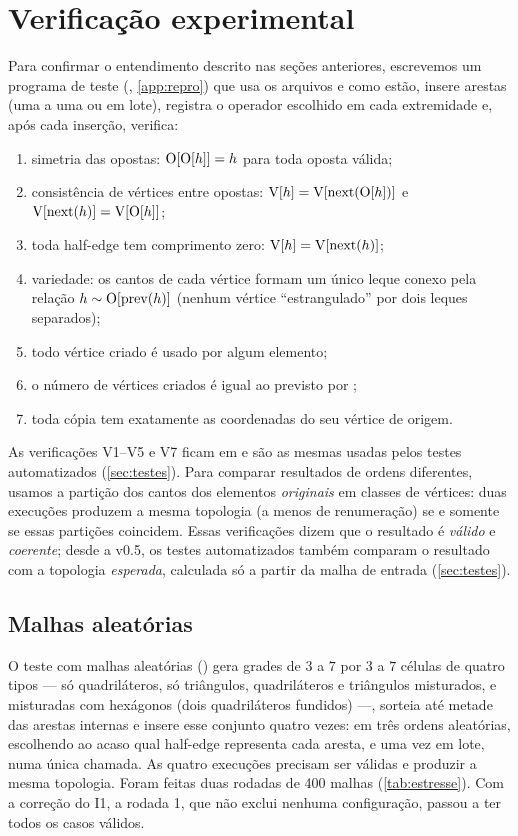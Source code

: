 \section{Verificação experimental}
\label{sec:verificacao}

Para confirmar o entendimento descrito nas seções anteriores, escrevemos um programa de teste
(, \cref{app:repro}) que usa os arquivos  e 
como estão, insere arestas (uma a uma ou em lote), registra o operador escolhido em cada extremidade e, após cada
inserção, verifica:
\begin{enumerate}[label=\textbf{V\arabic*.}]
\item simetria das opostas: $\mathrm{O}[\mathrm{O}[h]]=h$ para toda oposta válida;
\item consistência de vértices entre opostas: $\mathrm{V}[h]=\mathrm{V}[\mathrm{next}(\mathrm{O}[h])]$ e $\mathrm{V}[\mathrm{next}(h)]=\mathrm{V}[\mathrm{O}[h]]$;
\item toda half-edge \COLLAPSED{} tem comprimento zero: $\mathrm{V}[h]=\mathrm{V}[\mathrm{next}(h)]$;
\item variedade: os cantos de cada vértice formam um único leque conexo pela relação $h\sim\mathrm{O}[\mathrm{prev}(h)]$ (nenhum vértice
``estrangulado'' por dois leques separados);
\item todo vértice criado é usado por algum elemento;
\item o número de vértices criados é igual ao previsto por ;
\item toda cópia tem exatamente as coordenadas do seu vértice de origem.
\end{enumerate}
As verificações V1--V5 e V7 ficam em  e são as mesmas usadas pelos testes
automatizados (\cref{sec:testes}).
Para comparar resultados de ordens diferentes, usamos a partição dos cantos dos elementos \emph{originais} em classes de
vértices: duas execuções produzem a mesma topologia (a menos de renumeração) se e somente se essas partições coincidem.
Essas verificações dizem que o resultado é \emph{válido} e \emph{coerente}; desde a v0.5, os testes automatizados também
comparam o resultado com a topologia \emph{esperada}, calculada só a partir da malha de entrada (\cref{sec:testes}).

\subsection{Malhas aleatórias}

O teste com malhas aleatórias () gera grades de $3$ a $7$ por $3$ a $7$ células de quatro tipos
--- só quadriláteros, só triângulos, quadriláteros e triângulos misturados, e misturadas com hexágonos (dois
quadriláteros fundidos) ---, sorteia até metade das arestas internas e insere esse conjunto quatro vezes: em três ordens
aleatórias, escolhendo ao acaso qual half-edge representa cada aresta, e uma vez em lote, numa única chamada. As quatro
execuções precisam ser válidas e produzir a mesma topologia. Foram feitas duas rodadas de 400 malhas
(\cref{tab:estresse}). Com a correção do I1, a rodada 1, que não exclui nenhuma configuração, passou a ter todos os casos
válidos.

